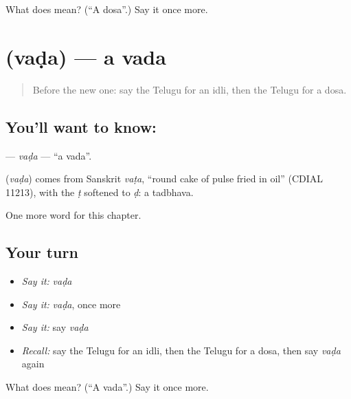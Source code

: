 \begin{tcolorbox}[breakable,colback=teal!4,colframe=teal!35!black,title={Before you move on}]
What does  mean? (\textquotedblleft{}A dosa\textquotedblright{}.) Say it once more.
\end{tcolorbox}
\section[\texorpdfstring{\te{వడ} (vaḍa)}{వడ (vaḍa)}]{ (vaḍa) — a vada}

\label{lesson:TE-C119-vada}



\begin{quote}
Before the new one: say the Telugu for an idli, then the Telugu for a dosa.
\end{quote}

\subsection*{You'll want to know: }
\textbf{} — \emph{vaḍa} — \textquotedblleft{}a vada\textquotedblright{}.

\begin{cousinweb}
\textbf{} (\emph{vaḍa}) comes from Sanskrit \emph{vaṭa}, \textquotedblleft{}round cake of pulse fried in oil\textquotedblright{} (CDIAL 11213), with the \emph{ṭ} softened to \emph{ḍ}: a tadbhava.
\end{cousinweb}

\begin{grammarlens}[title={What you've built}]
One more word for this chapter.
\end{grammarlens}

\subsection*{Your turn}
\begin{itemize}
\raggedright
  \item \emph{Say it:} \emph{vaḍa}
  \item \emph{Say it:} \emph{vaḍa}, once more
  \item \emph{Say it:} say \emph{vaḍa}
  \item \emph{Recall:} say the Telugu for an idli, then the Telugu for a dosa, then say \emph{vaḍa} again
\end{itemize}

\begin{tcolorbox}[breakable,colback=teal!4,colframe=teal!35!black,title={Before you move on}]
What does  mean? (\textquotedblleft{}A vada\textquotedblright{}.) Say it once more.
\end{tcolorbox}
